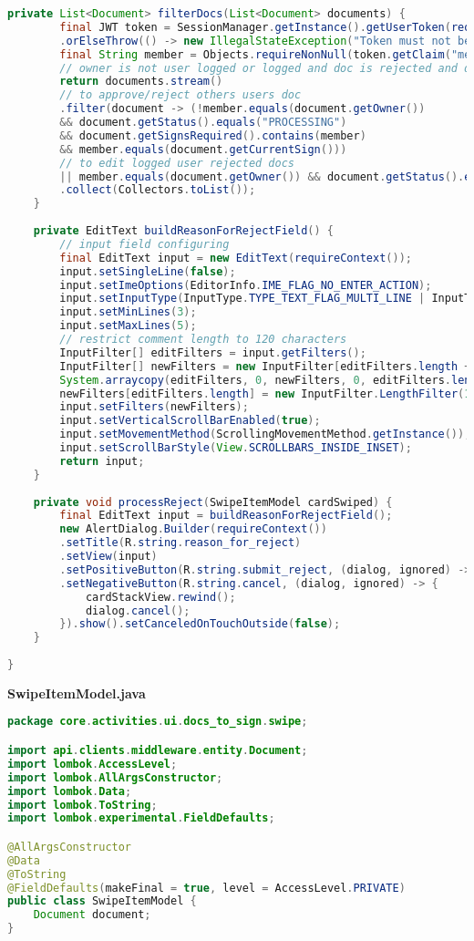 \begin{lstlisting}[language=Java]
	private List<Document> filterDocs(List<Document> documents) {
		final JWT token = SessionManager.getInstance().getUserToken(requireContext())
		.orElseThrow(() -> new IllegalStateException("Token must not be null at this stage."));
		final String member = Objects.requireNonNull(token.getClaim("member")).asString();
		// owner is not user logged or logged and doc is rejected and doc requires his sign and it is hit turn to sign\edit
		return documents.stream()
		// to approve/reject others users doc
		.filter(document -> (!member.equals(document.getOwner())
		&& document.getStatus().equals("PROCESSING")
		&& document.getSignsRequired().contains(member)
		&& member.equals(document.getCurrentSign()))
		// to edit logged user rejected docs
		|| member.equals(document.getOwner()) && document.getStatus().equals("REJECTED"))
		.collect(Collectors.toList());
	}
	
	private EditText buildReasonForRejectField() {
		// input field configuring
		final EditText input = new EditText(requireContext());
		input.setSingleLine(false);
		input.setImeOptions(EditorInfo.IME_FLAG_NO_ENTER_ACTION);
		input.setInputType(InputType.TYPE_TEXT_FLAG_MULTI_LINE | InputType.TYPE_CLASS_TEXT);
		input.setMinLines(3);
		input.setMaxLines(5);
		// restrict comment length to 120 characters
		InputFilter[] editFilters = input.getFilters();
		InputFilter[] newFilters = new InputFilter[editFilters.length + 1];
		System.arraycopy(editFilters, 0, newFilters, 0, editFilters.length);
		newFilters[editFilters.length] = new InputFilter.LengthFilter(120);
		input.setFilters(newFilters);
		input.setVerticalScrollBarEnabled(true);
		input.setMovementMethod(ScrollingMovementMethod.getInstance());
		input.setScrollBarStyle(View.SCROLLBARS_INSIDE_INSET);
		return input;
	}
	
	private void processReject(SwipeItemModel cardSwiped) {
		final EditText input = buildReasonForRejectField();
		new AlertDialog.Builder(requireContext())
		.setTitle(R.string.reason_for_reject)
		.setView(input)
		.setPositiveButton(R.string.submit_reject, (dialog, ignored) -> model.getResult().setValue(new Result.Reject(cardSwiped, input.getText().toString())))
		.setNegativeButton(R.string.cancel, (dialog, ignored) -> {
			cardStackView.rewind();
			dialog.cancel();
		}).show().setCanceledOnTouchOutside(false);
	}
	
}
\end{lstlisting}
\textbf{SwipeItemModel.java}
\begin{lstlisting}[language=Java]
package core.activities.ui.docs_to_sign.swipe;

import api.clients.middleware.entity.Document;
import lombok.AccessLevel;
import lombok.AllArgsConstructor;
import lombok.Data;
import lombok.ToString;
import lombok.experimental.FieldDefaults;

@AllArgsConstructor
@Data
@ToString
@FieldDefaults(makeFinal = true, level = AccessLevel.PRIVATE)
public class SwipeItemModel {
	Document document;
}

\end{lstlisting}
